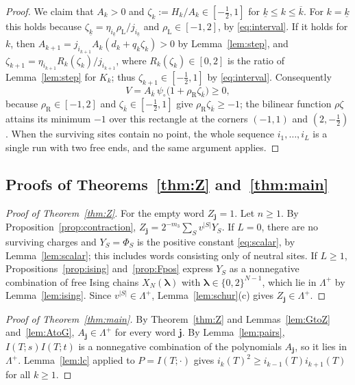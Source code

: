 \documentclass{amsart}
\theoremstyle{definition}
\theoremstyle{remark}
\numberwithin{equation}{section}
\newcommand{\jj}{\mathbf{j}}
\newcommand{\Lp}{\Lambda^{+}}
\newcommand{\vac}{\circ}
\begin{document}
\begin{proof}
We claim that $A_k>0$ and $\zeta_k:=H_k/A_k\in[-\frac12,1]$ for $\underline k\le k\le\overline k$. For $k=\underline k$ this holds because $\zeta_{\underline k}=\eta_{i_{\underline k}}\rho_{\mathrm L}/j_{i_{\underline k}}$ and $\rho_{\mathrm L}\in[-1,2]$, by \eqref{eq:interval}. If it holds for $k$, then $A_{k+1}=j_{i_{k+1}}A_k(d_k+q_k\zeta_k)>0$ by Lemma~\ref{lem:step}, and $\zeta_{k+1}=\eta_{i_{k+1}}R_k(\zeta_k)/j_{i_{k+1}}$, where $R_k(\zeta_k)\in[0,2]$ is the ratio of Lemma~\ref{lem:step} for $K_k$; thus $\zeta_{k+1}\in[-\frac12,1]$ by \eqref{eq:interval}. Consequently
\[
V=A_{\overline k}\,\psi_\vac\bigl(1+\rho_{\mathrm R}\zeta_{\overline k}\bigr)\ge0,
\]
because $\rho_{\mathrm R}\in[-1,2]$ and $\zeta_{\overline k}\in[-\frac12,1]$ give $\rho_{\mathrm R}\zeta_{\overline k}\ge-1$; the bilinear function $\rho\zeta$ attains its minimum $-1$ over this rectangle at the corners $(-1,1)$ and $(2,-\frac12)$. When the surviving sites contain no point, the whole sequence $i_1,\dots,i_L$ is a single run with two free ends, and the same argument applies.
\end{proof}

\subsection{Proofs of Theorems~\ref{thm:Z} and~\ref{thm:main}}

\begin{proof}[Proof of Theorem~\ref{thm:Z}]
For the empty word $Z_\jj=1$. Let $n\ge1$. By Proposition~\ref{prop:contraction}, $Z_\jj=2^{-m_3}\sum_Sv^{|S|}Y_S$. If $L=0$, there are no surviving charges and $Y_S=\Phi_S$ is the positive constant \eqref{eq:scalar}, by Lemma~\ref{lem:scalar}; this includes words consisting only of neutral sites. If $L\ge1$, Propositions~\ref{prop:ising} and~\ref{prop:Fpos} express $Y_S$ as a nonnegative combination of free Ising chains $X_N(\boldsymbol\lambda)$ with $\boldsymbol\lambda\in\{0,2\}^{N-1}$, which lie in $\Lp$ by Lemma~\ref{lem:ising}. Since $v^{|S|}\in\Lp$, Lemma~\ref{lem:schur}(c) gives $Z_\jj\in\Lp$.
\end{proof}

\begin{proof}[Proof of Theorem~\ref{thm:main}]
By Theorem~\ref{thm:Z} and Lemmas~\ref{lem:GtoZ} and~\ref{lem:AtoG}, $A_\jj\in\Lp$ for every word $\jj$. By Lemma~\ref{lem:pairs}, $I(T;s)I(T;t)$ is a nonnegative combination of the polynomials $A_\jj$, so it lies in $\Lp$. Lemma~\ref{lem:lc} applied to $P=I(T;\cdot)$ gives $i_k(T)^2\ge i_{k-1}(T)i_{k+1}(T)$ for all $k\ge1$.
\end{proof}
\end{document}
